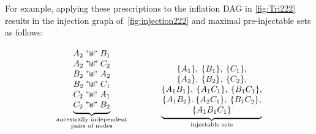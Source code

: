 For example, applying these prescriptions to the inflation DAG in \cref{fig:Tri222} results in the injection graph of~\cref{fig:injection222} and maximal pre-injectable sets as follows:
\begin{align}\label{eq:basicsetup222}
{\underbrace{\begin{matrix}
A_2\aindep B_1\\
A_2\aindep C_2\\
B_2\aindep A_2\\
B_2\aindep C_1\\
C_2\aindep A_1\\
C_2\aindep B_2
\end{matrix}}_{\substack{\text{ancestrally independent}\\\text{pairs of nodes}}}}
\qquad\qquad
{\underbrace{\begin{matrix}
\\ \\
\brackets{A_1},\:\brackets{B_1},\:\brackets{C_1},\\
\brackets{A_2},\:\brackets{B_2},\:\brackets{C_2},\\
\brackets{A_1 B_1},\:\brackets{A_1 C_1},\:\brackets{B_1 C_1},\\
\brackets{A_1 B_2}.\:\brackets{A_2 C_1},\:\brackets{B_1 C_2},\\
\brackets{A_1 B_1 C_1}
\end{matrix}}_{\substack{\text{injectable sets}}}}

\end{align}
